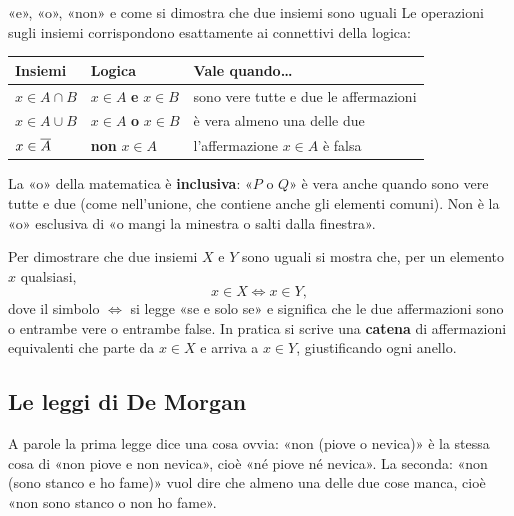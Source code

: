 \begin{richiamo}{«e», «o», «non» e come si dimostra che due insiemi sono uguali}
Le operazioni sugli insiemi corrispondono esattamente ai connettivi della logica:
\begin{center}
\renewcommand{\arraystretch}{1.25}
\begin{tabular}{@{}lll@{}}
  \toprule
  \textbf{Insiemi} & \textbf{Logica} & \textbf{Vale quando\ldots} \\
  \midrule
  $x \in A \cap B$ & $x \in A$ \textbf{e} $x \in B$ & sono vere tutte e due le affermazioni \\
  $x \in A \cup B$ & $x \in A$ \textbf{o} $x \in B$ & è vera almeno una delle due \\
  $x \in \overline{A}$ & \textbf{non} $x \in A$ & l'affermazione $x \in A$ è falsa \\
  \bottomrule
\end{tabular}
\end{center}
La «o» della matematica è \textbf{inclusiva}: «$P$ o $Q$» è vera anche quando sono vere tutte e due (come nell'unione,
che contiene anche gli elementi comuni). Non è la «o» esclusiva di «o mangi la minestra o salti dalla finestra».

Per dimostrare che due insiemi $X$ e $Y$ sono uguali si mostra che, per un elemento $x$ qualsiasi,
\[ x \in X \iff x \in Y , \]
dove il simbolo $\iff$ si legge «se e solo se» e significa che le due affermazioni sono o entrambe vere o entrambe
false. In pratica si scrive una \textbf{catena} di affermazioni equivalenti che parte da $x \in X$ e arriva a
$x \in Y$, giustificando ogni anello.
\end{richiamo}

\subsection{Le leggi di De Morgan}


A parole la prima legge dice una cosa ovvia: «non (piove o nevica)» è la stessa cosa di «non piove e non nevica», cioè
«né piove né nevica». La seconda: «non (sono stanco e ho fame)» vuol dire che almeno una delle due cose manca, cioè
«non sono stanco o non ho fame».

